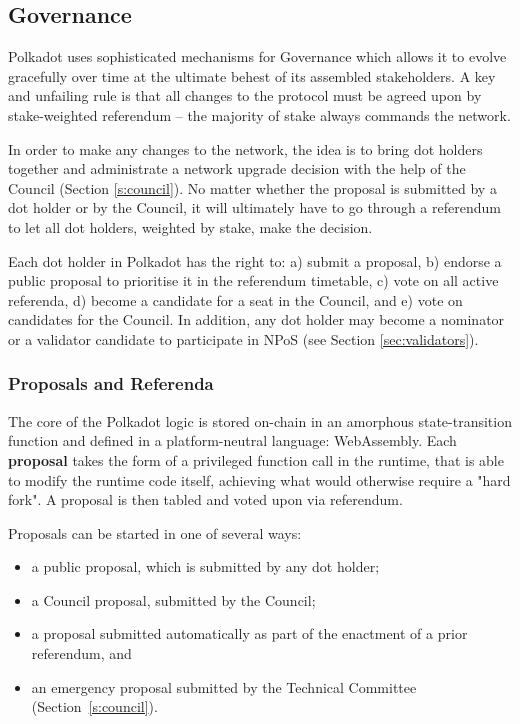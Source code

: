 \subsection{Governance}\label{sec:governance}

Polkadot uses sophisticated mechanisms for Governance which allows it to evolve gracefully over time at the ultimate behest of its assembled stakeholders. A key and unfailing rule is that all changes to the protocol must be agreed upon by stake-weighted referendum -- the majority of stake always commands the network.

In order to make any changes to the network, the idea is to bring dot holders together and administrate a network upgrade decision with the help of the Council (Section \ref{s:council}). No matter whether the proposal is submitted by a dot holder or by the Council, it will ultimately have to go through a referendum to let all dot holders, weighted by stake, make the decision.

Each dot holder in Polkadot has the right to: a) submit a proposal, b) endorse a public proposal to prioritise it in the referendum timetable, c) vote on all active referenda, d) become a candidate for a seat in the Council, and e) vote on candidates for the Council. In addition, any dot holder may become a nominator or a validator candidate to participate in NPoS (see Section \ref{sec:validators}).

\subsubsection{Proposals and Referenda}

The core of the Polkadot logic is stored on-chain in an amorphous state-transition function and defined in a platform-neutral language: WebAssembly. Each \textbf{proposal} takes the form of a privileged function call in the runtime, that is able to modify the runtime code itself, achieving what would otherwise require a "hard fork". A proposal is then tabled and voted upon via referendum. 

Proposals can be started in one of several ways:
\begin{itemize}
\item a public proposal, which is submitted by any dot holder;
\item a Council proposal, submitted by the Council;
\item a proposal submitted automatically as part of the enactment of a prior referendum, and
\item an emergency proposal submitted by the Technical Committee (Section~\ref{s:council}).
\end{itemize} 

